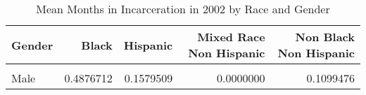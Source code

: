 \begin{table}[H]

\caption{\label{tab:tab:summarystats}Mean Months in Incarceration in 2002 by Race and Gender}
\centering
\begin{tabular}[t]{lrrrr}
\toprule
Gender & Black & Hispanic & Mixed Race Non Hispanic & Non Black Non Hispanic\\
\midrule
\cellcolor{gray!6}{Female} & \cellcolor{gray!6}{0.0211268} & \cellcolor{gray!6}{0.0298013} & \cellcolor{gray!6}{0.1428571} & \cellcolor{gray!6}{0.0193192}\\
Male & 0.4876712 & 0.1579509 & 0.0000000 & 0.1099476\\
\bottomrule
\end{tabular}
\end{table}
